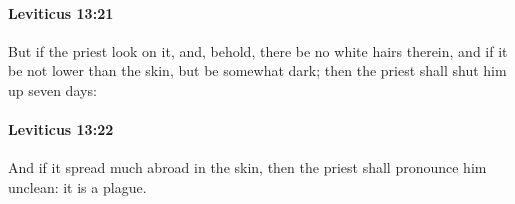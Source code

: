 		\paragraph{Leviticus 13:21} %
			\label{LEVITICUS-13-21}

			But if the priest look on it, and, behold, there be no white hairs therein, and if it be not lower than the skin, but be somewhat dark; then the priest shall shut him up seven days:


		\paragraph{Leviticus 13:22} %
			\label{LEVITICUS-13-22}

			And if it spread much abroad in the skin, then the priest shall pronounce him unclean: it is a plague.


